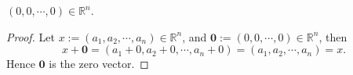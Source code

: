 \begin{Exercise}
	\begin{answer}
		$(0, 0, \cdots, 0)\in\mathbb{R}^n$.
	\end{answer}
	\begin{proof}
		Let $x := (a_1, a_2, \cdots, a_n)\in\mathbb{R}^n$, and $\mathbf{0} := (0, 0, \cdots, 0)\in\mathbb{R}^n$, then 
		$$
		x+\mathbf{0}
		= (a_1 + 0, a_2 + 0, \cdots, a_n + 0)
		= (a_1, a_2, \cdots, a_n)
		= x.
		$$
		Hence $\mathbf{0}$ is the zero vector.
	\end{proof}
\end{Exercise}